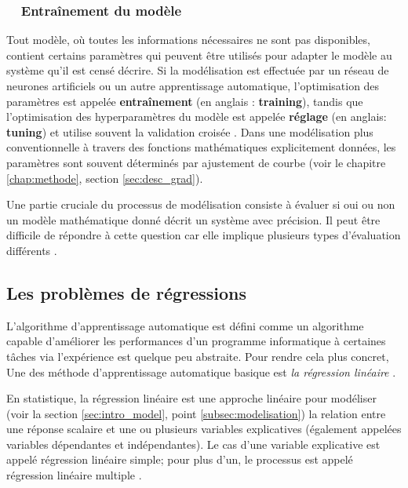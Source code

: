 	\subsubsection*{\qquad \textbullet \ \ Entraînement du modèle}
	
	Tout modèle, où toutes les informations nécessaires ne sont pas disponibles, contient certains paramètres qui peuvent être utilisés pour adapter le modèle au système qu'il est censé décrire. Si la modélisation est effectuée par un réseau de neurones artificiels ou un autre apprentissage automatique, l'optimisation des paramètres est appelée \textbf{entraînement} (en anglais : \textbf{training}), tandis que l'optimisation des hyperparamètres du modèle est appelée \textbf{réglage} (en anglais: \textbf{tuning}) et utilise souvent la validation croisée \cite{goodfellow2016deep}. Dans une modélisation plus conventionnelle à travers des fonctions mathématiques explicitement données, les paramètres sont souvent déterminés par ajustement de courbe (voir le chapitre \ref{chap:methode}, section \ref{sec:desc_grad}).
	
	
	Une partie cruciale du processus de modélisation consiste à évaluer si oui ou non un modèle mathématique donné décrit un système avec précision. Il peut être difficile de répondre à cette question car elle implique plusieurs types d'évaluation différents \cite{matloff2017statistical, goodfellow2016deep}.
	
	
	
	\subsection{Les problèmes de régressions} \label{sec:regression_problem}
	
	L'algorithme d'apprentissage automatique est défini comme un algorithme capable d'améliorer les performances d'un programme informatique à certaines tâches via l'expérience est quelque peu abstraite. Pour rendre cela plus concret, Une des méthode d'apprentissage automatique basique est \emph{la régression linéaire} \cite{goodfellow2016deep}.
	
	En statistique, la régression linéaire est une approche linéaire pour modéliser (voir la section \ref{sec:intro_model}, point \ref{subsec:modelisation}) la relation entre une réponse scalaire et une ou plusieurs variables explicatives (également appelées variables dépendantes et indépendantes). Le cas d'une variable explicative est appelé régression linéaire simple; pour plus d'un, le processus est appelé régression linéaire multiple \cite{darlington2016regression}.
	
